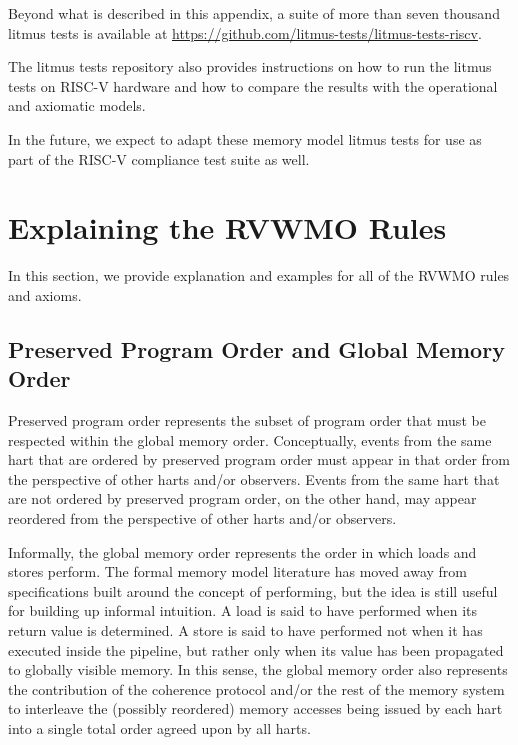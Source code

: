 Beyond what is described in this appendix, a suite of more than seven thousand litmus tests is available at \url{https://github.com/litmus-tests/litmus-tests-riscv}.

\begin{commentary}
  The litmus tests repository also provides instructions on how to run
  the litmus tests on RISC-V hardware and how to compare the results
  with the operational and axiomatic models.
\end{commentary}

\begin{commentary}
  In the future, we expect to adapt these memory model litmus tests for use as part of the RISC-V compliance test suite as well.
\end{commentary}

\section{Explaining the RVWMO Rules}
In this section, we provide explanation and examples for all of the RVWMO rules and axioms.

\subsection{Preserved Program Order and Global Memory Order}
Preserved program order represents the subset of program order that must be respected within the global memory order.
Conceptually, events from the same hart that are ordered by preserved program order must appear in that order from the perspective of other harts and/or observers.
Events from the same hart that are not ordered by preserved program order, on the other hand, may appear reordered from the perspective of other harts and/or observers.

Informally, the global memory order represents the order in which loads and stores perform.
The formal memory model literature has moved away from specifications built around the concept of performing, but the idea is still useful for building up informal intuition.
A load is said to have performed when its return value is determined.
A store is said to have performed not when it has executed inside the pipeline, but rather only when its value has been propagated to globally visible memory.
In this sense, the global memory order also represents the contribution of the coherence protocol and/or the rest of the memory system to interleave the (possibly reordered) memory accesses being issued by each hart into a single total order agreed upon by all harts.


